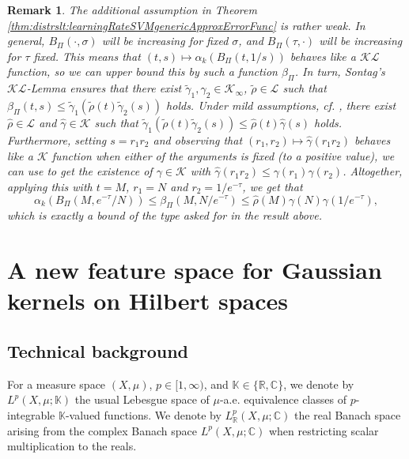 \documentclass[letterpaper]{article} %
\newcommand{\R}{\mathbb{R}}
\newcommand{\cK}{\mathcal{K}} %
\newcommand{\cL}{\mathcal{L}} %
\newcommand{\hilbertianEmbed}{\Pi} %
\newcommand{\C}{\mathbb{C}}
\newcommand{\hilbertianEmbedBound}{B_\hilbertianEmbed} %
\newcommand{\cKi}{\cK_\infty} %
\newcommand{\cKL}{\mathcal{KL}} %
\newcommand{\K}{\mathbb{K}} %
\newtheorem{remark}[theorem]{Remark}
\begin{document}
\begin{remark}
The additional assumption in Theorem \ref{thm:distrslt:learningRateSVMgenericApproxErrorFunc} is rather weak.
In general, $\hilbertianEmbedBound(\cdot, \sigma)$ will be increasing for fixed $\sigma$, and $\hilbertianEmbedBound(\tau,\cdot)$ will be increasing for $\tau$ fixed.
This means that $(t,s)\mapsto \alpha_k(\hilbertianEmbedBound(t,1/s))$ behaves like a $\cKL$ function, so we can upper bound this by such a function $\beta_\hilbertianEmbed$.
In turn, Sontag's $\cKL$-Lemma ensures that there exist $\tilde \gamma_1,\gamma_2\in\cKi$, $\tilde \rho\in\cL$ such that
$\beta_\hilbertianEmbed(t,s)\leq\tilde\gamma_1(\tilde\rho(t)\tilde\gamma_2(s))$ holds.
Under mild assumptions, cf. \cite[Lemma~8]{kellett2014compendium}, there exist $\hat\rho\in\cL$ and $\hat\gamma\in\cK$ such that
$\tilde\gamma_1(\tilde\rho(t)\tilde\gamma_2(s)) \leq \hat\rho(t)\hat\gamma(s)$ holds.
Furthermore, setting $s=r_1r_2$ and observing that $(r_1,r_2) \mapsto \hat\gamma(r_1r_2)$ behaves like a $\cK$ function when either of the arguments is fixed (to a positive value), we can use \cite[Lemma~11]{kellett2014compendium} to get the existence of $\gamma\in\cK$ with $\hat\gamma(r_1r_2)\leq \gamma(r_1)\gamma(r_2)$.
Altogether, applying this with $t=M$, $r_1=N$ and $r_2=1/e^{-\tau}$, we get that
\begin{equation*}
    \alpha_k(\hilbertianEmbedBound(M,e^{-\tau}/N)) \leq \beta_\hilbertianEmbed(M, N/e^{-\tau}) \leq \hat\rho(M)\gamma(N)\gamma(1/e^{-\tau}),
\end{equation*}
which is exactly a bound of the type asked for in the result above.
\end{remark}
\section{A new feature space for Gaussian kernels on Hilbert spaces}
\subsection{Technical background} \label{sec:distrslt:technicalBackgroundForFeatureSpace}
For a measure space $(X,\mu)$, $p\in[1,\infty)$, and $\K\in\{\R,\C\}$, we denote by $L^p(X,\mu;\K)$ the usual Lebesgue space of $\mu$-a.e. equivalence classes of $p$-integrable $\K$-valued functions.
We denote by $L^p_\R(X,\mu;\C)$ the real Banach space arising from the complex Banach space $L^p(X,\mu;\C)$ when restricting scalar multiplication to the reals.
\end{document}
